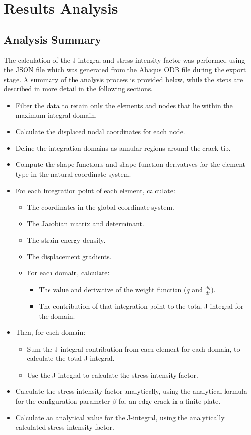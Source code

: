 \newpage
\section{Results Analysis}

\subsection{Analysis Summary}

The calculation of the J-integral and stress intensity factor was performed using the JSON file which was generated from the Abaqus ODB file during the export stage. A summary of the analysis process is provided below, while the steps are described in more detail in the following sections.

\begin{itemize}
	\item Filter the data to retain only the elements and nodes that lie within the maximum integral domain.
	\item Calculate the displaced nodal coordinates for each node.
	\item Define the integration domains as annular regions around the crack tip.
	\item Compute the shape functions and shape function derivatives for the element type in the natural coordinate system.
	\item For each integration point of each element, calculate:
	\begin{itemize}
		\item The coordinates in the global coordinate system.
		\item The Jacobian matrix and determinant.
		\item The strain energy density.
		\item The displacement gradients.
		\item For each domain, calculate:
		\begin{itemize}
			\item The value and derivative of the weight function ($q$ and $\frac{dq}{dr}$).
			\item The contribution of that integration point to the total J-integral for the domain.
		\end{itemize}
	\end{itemize}
	\item Then, for each domain:
	\begin{itemize}
		\item Sum the J-integral contribution from each element for each domain, to calculate the total J-integral.
		\item Use the J-integral to calculate the stress intensity factor.
	\end{itemize}
	\item Calculate the stress intensity factor analytically, using the analytical formula for the configuration parameter $\beta$ for an edge-crack in a finite plate.
	\item Calculate an analytical value for the J-integral, using the analytically calculated stress intensity factor.
	
\end{itemize}

